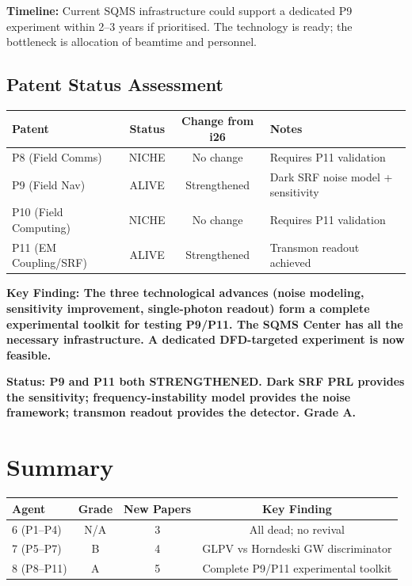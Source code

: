 \documentclass[11pt,a4paper]{article}
\begin{document}
\textbf{Timeline:} Current SQMS infrastructure could support a dedicated P9 experiment within 2--3 years if prioritised. The technology is ready; the bottleneck is allocation of beamtime and personnel.

\subsection{Patent Status Assessment}

\begin{center}
\begin{tabular}{lccl}
\toprule
\textbf{Patent} & \textbf{Status} & \textbf{Change from i26} & \textbf{Notes} \\
\midrule
P8 (Field Comms) & NICHE & No change & Requires P11 validation \\
P9 (Field Nav) & ALIVE & Strengthened & Dark SRF noise model + sensitivity \\
P10 (Field Computing) & NICHE & No change & Requires P11 validation \\
P11 (EM Coupling/SRF) & ALIVE & Strengthened & Transmon readout achieved \\
\bottomrule
\end{tabular}
\end{center}

\textbf{Key Finding: The three technological advances (noise modeling, sensitivity improvement, single-photon readout) form a complete experimental toolkit for testing P9/P11. The SQMS Center has all the necessary infrastructure. A dedicated DFD-targeted experiment is now feasible.}

\textbf{Status: P9 and P11 both STRENGTHENED. Dark SRF PRL provides the sensitivity; frequency-instability model provides the noise framework; transmon readout provides the detector. Grade A.}

\section{Summary}

\begin{center}
\begin{tabular}{lccc}
\toprule
\textbf{Agent} & \textbf{Grade} & \textbf{New Papers} & \textbf{Key Finding} \\
\midrule
6 (P1--P4) & N/A & 3 & All dead; no revival \\
7 (P5--P7) & B & 4 & GLPV vs Horndeski GW discriminator \\
8 (P8--P11) & A & 5 & Complete P9/P11 experimental toolkit \\
\bottomrule
\end{tabular}
\end{center}
\end{document}
